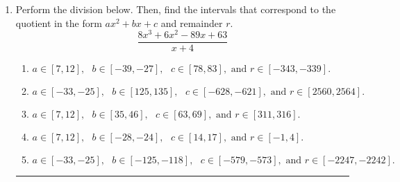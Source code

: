 \documentclass[14pt]{extbook}
\newcommand{\litem}[1]{\item#1\hspace*{-1cm}\rule{\textwidth}{0.4pt}}
\begin{document}
\begin{enumerate}
{\begin{enumerate}[label=\Alph*.]
\end{enumerate} }
\litem{
Perform the division below. Then, find the intervals that correspond to the quotient in the form $ax^2+bx+c$ and remainder $r$.\[ \frac{8x^{3} +6 x^{2} -89 x + 63}{x + 4} \]\begin{enumerate}[label=\Alph*.]
\item \( a \in [7, 12], \text{   } b \in [-39, -27], \text{   } c \in [78, 83], \text{   and   } r \in [-343, -339]. \)
\item \( a \in [-33, -25], \text{   } b \in [125, 135], \text{   } c \in [-628, -621], \text{   and   } r \in [2560, 2564]. \)
\item \( a \in [7, 12], \text{   } b \in [35, 46], \text{   } c \in [63, 69], \text{   and   } r \in [311, 316]. \)
\item \( a \in [7, 12], \text{   } b \in [-28, -24], \text{   } c \in [14, 17], \text{   and   } r \in [-1, 4]. \)
\item \( a \in [-33, -25], \text{   } b \in [-125, -118], \text{   } c \in [-579, -573], \text{   and   } r \in [-2247, -2242]. \)

\end{enumerate} }
\end{enumerate}
\end{document}
